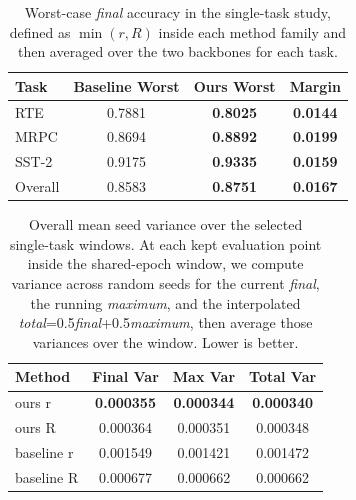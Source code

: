 \documentclass{article}
\begin{document}
\begin{table}[H]
\centering
\caption{Worst-case \textit{final} accuracy in the single-task study, defined
as $\min(r, R)$ inside each method family and then averaged over the two
backbones for each task.}
\label{tab:single-worst-final}
\begin{tabular}{lccc}
\toprule
Task & Baseline Worst & Ours Worst & Margin \\
\midrule
RTE & 0.7881 & \textbf{0.8025} & \textbf{0.0144} \\
MRPC & 0.8694 & \textbf{0.8892} & \textbf{0.0199} \\
SST-2 & 0.9175 & \textbf{0.9335} & \textbf{0.0159} \\
Overall & 0.8583 & \textbf{0.8751} & \textbf{0.0167} \\
\bottomrule
\end{tabular}
\end{table}

\begin{table}[H]
\centering
\caption{Overall mean seed variance over the selected single-task windows.
At each kept evaluation point inside the shared-epoch window, we compute
variance across random seeds for the current \textit{final}, the running
\textit{maximum}, and the interpolated
\textit{total}=0.5\cdot\textit{final}+0.5\cdot\textit{maximum}, then average
those variances over the window. Lower is better.}
\label{tab:single-seed-variance}
\begin{tabular}{lccc}
\toprule
Method & Final Var & Max Var & Total Var \\
\midrule
ours r     & \textbf{0.000355} & \textbf{0.000344} & \textbf{0.000340} \\
ours R     & 0.000364 & 0.000351 & 0.000348 \\
baseline r & 0.001549 & 0.001421 & 0.001472 \\
baseline R & 0.000677 & 0.000662 & 0.000662 \\
\bottomrule
\end{tabular}
\end{table}
\end{document}
